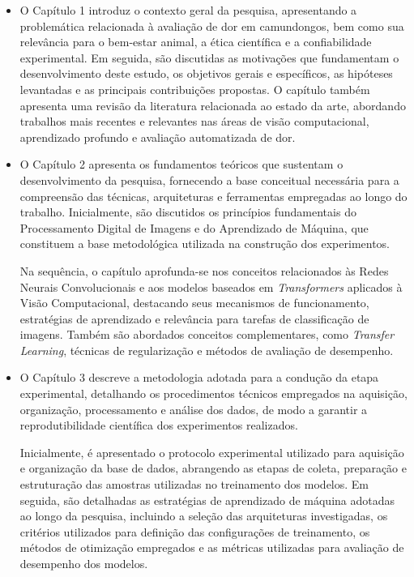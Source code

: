 \begin{itemize}
	
	\item O Capítulo 1 introduz o contexto geral da pesquisa, apresentando a problemática relacionada à avaliação de dor em camundongos, bem como sua relevância para o bem-estar animal, a ética científica e a confiabilidade experimental. Em seguida, são discutidas as motivações que fundamentam o desenvolvimento deste estudo, os objetivos gerais e específicos, as hipóteses levantadas e as principais contribuições propostas. O capítulo também apresenta uma revisão da literatura relacionada ao estado da arte, abordando trabalhos mais recentes e relevantes nas áreas de visão computacional, aprendizado profundo e avaliação automatizada de dor.
	
	\item O Capítulo 2 apresenta os fundamentos teóricos que sustentam o desenvolvimento da pesquisa, fornecendo a base conceitual necessária para a compreensão das técnicas, arquiteturas e ferramentas empregadas ao longo do trabalho. Inicialmente, são discutidos os princípios fundamentais do Processamento Digital de Imagens e do Aprendizado de Máquina, que constituem a base metodológica utilizada na construção dos experimentos.
	
	Na sequência, o capítulo aprofunda-se nos conceitos relacionados às Redes Neurais Convolucionais e aos modelos baseados em \textit{Transformers} aplicados à Visão Computacional, destacando seus mecanismos de funcionamento, estratégias de aprendizado e relevância para tarefas de classificação de imagens. Também são abordados conceitos complementares, como \textit{Transfer Learning}, técnicas de regularização e métodos de avaliação de desempenho.
	
	\item O Capítulo 3 descreve a metodologia adotada para a condução da etapa experimental, detalhando os procedimentos técnicos empregados na aquisição, organização, processamento e análise dos dados, de modo a garantir a reprodutibilidade científica dos experimentos realizados.
	
	Inicialmente, é apresentado o protocolo experimental utilizado para aquisição e organização da base de dados, abrangendo as etapas de coleta, preparação e estruturação das amostras utilizadas no treinamento dos modelos. Em seguida, são detalhadas as estratégias de aprendizado de máquina adotadas ao longo da pesquisa, incluindo a seleção das arquiteturas investigadas, os critérios utilizados para definição das configurações de treinamento, os métodos de otimização empregados e as métricas utilizadas para avaliação de desempenho dos modelos.
	

\end{itemize}
